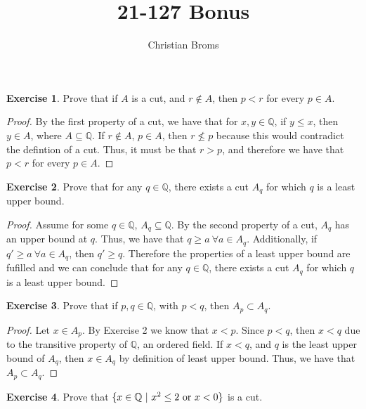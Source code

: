 \documentclass{article}
\theoremstyle{definition}
\newtheorem{exercise}{Exercise}
\newcommand{\Q}{\mathbb{Q}}
\begin{document}
\title{21-127 Bonus}
\author{Christian Broms}

\maketitle


\begin{exercise}
Prove that if $A$ is a cut, and $r\notin A$, then $p<r$ for every $p\in A$.
\end{exercise}

\begin{proof}
By the first property of a cut, we have that for $x, y \in \Q$, if $y \leq x$, then $y \in A$, where $A \subseteq \Q$. If $r \notin A$, $p \in A$, then $r \nleq p$ because this would contradict the defintion of a cut. Thus, it must be that $r > p$, and therefore we have that $p < r$ for every $p \in A$. 
\end{proof}


\begin{exercise}\label{ratcuts}
Prove that for any $q\in \Q$, there exists a cut $A_q$ for which $q$ is a least upper bound.
\end{exercise}

\begin{proof}
Assume for some $q \in \Q$, $A_q \subseteq \Q$. By the second property of a cut, $A_q$ has an upper bound at $q$. Thus, we have that $q \geq a\ \forall a \in A_q$. Additionally, if $q' \geq a\ \forall a \in A_q$, then $q' \geq q$. Therefore the properties of a least upper bound are fufilled and we can conclude that for any $q\in \Q$, there exists a cut $A_q$ for which $q$ is a least upper bound.
\end{proof}

\begin{exercise}\label{ratorder}
Prove that if $p, q\in \Q$, with $p< q$, then $A_p\subset A_q$.
\end{exercise}

\begin{proof}
Let $x \in A_p$. By Exercise 2 we know that $x < p$. Since $p < q$, then $x < q$ due to the transitive property of $\Q$, an ordered field. If $x < q$, and $q$ is the least upper bound of $A_q$, then $x \in A_q$ by definition of least upper bound. Thus, we have that $A_p\subset A_q$. 
\end{proof}

\begin{exercise}\label{sqrtcut}
Prove that $\{x\in \Q\ | \ x^2\leq 2\hbox{ or } x<0\}$ is a cut.
\end{exercise}
\end{document}
